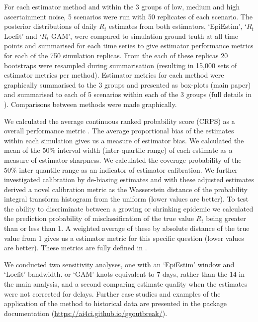 \documentclass[10pt,letterpaper]{article}
\begin{document}
For each estimator method and within the 3 groups of low, medium and high ascertainment noise, 5 scenarios were run with 50 replicates of each scenario. The posterior distributions of daily $R_t$ estimates from both estimators, `EpiEstim', `$R_t$ Locfit' and `$R_t$ GAM', were compared to simulation ground truth at all time points and summarised for each time series to give estimator performance metrics for each of the 750 simulation replicas. From the each of these replicas 20 bootstraps were resampled during summarisation (resulting in 15,000 sets of estimator metrics per method). Estimator metrics for each method were graphically summarised to the 3 groups and presented as box-plots (main paper) and summarised to each of 5 scenarios within each of the 3 groups (full details in ). Comparisons between methods were made graphically.

We calculated the average continuous ranked probability score (CRPS) as a overall performance metric \cite{anderson1996,bosse2024,bosse2023,brocker2008,gneiting2007}. The average proportional bias of the estimates within each simulation gives us a measure of estimator bias. We calculated the mean of the 50\% interval width (inter-quartile range) of each estimate as a measure of estimator sharpness. We calculated the coverage probability of the 50\% inter quantile range as an indicator of estimator calibration. We further investigated calibration by de-biasing estimates and with these adjusted estimates derived a novel calibration metric as the Wasserstein distance \cite{panaretos2019} of the probability integral transform histogram from the uniform \cite{david1948,hamill2001,wilks2019,brockwell2007} (lower values are better). To test the ability to discriminate between a growing or shrinking epidemic we calculated the prediction probability of misclassification of the true value $R_t$ being greater than or less than 1. A weighted average of these by absolute distance of the true value from 1 gives us a estimator metric for this specific question (lower values are better). These metrics are fully defined in .

We conducted two sensitivity analyses, one with an `EpiEstim' window and `Locfit' bandwidth. or `GAM' knots equivalent to 7 days, rather than the 14 in the main analysis, and a second comparing estimate quality when the estimates were not corrected for delays. Further case studies and examples of the application of the method to historical data are presented in the package documentation (\url{https://ai4ci.github.io/ggoutbreak/}).
\end{document}
